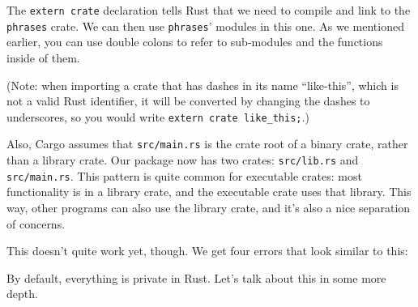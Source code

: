 \documentclass[a4paper,]{book}
\newenvironment{Shaded}{\begin{snugshade}}{\end{snugshade}}
\newcommand{\KeywordTok}[1]{\textcolor[rgb]{0.13,0.29,0.53}{\textbf{{#1}}}}
\newcommand{\StringTok}[1]{\textcolor[rgb]{0.31,0.60,0.02}{{#1}}}
\newcommand{\NormalTok}[1]{{#1}}
\begin{document}
The \texttt{extern\ crate} declaration tells Rust that we need to
compile and link to the \texttt{phrases} crate. We can then use
\texttt{phrases}' modules in this one. As we mentioned earlier, you can
use double colons to refer to sub-modules and the functions inside of
them.

(Note: when importing a crate that has dashes in its name ``like-this'',
which is not a valid Rust identifier, it will be converted by changing
the dashes to underscores, so you would write
\texttt{extern\ crate\ like\_this;}.)

Also, Cargo assumes that \texttt{src/main.rs} is the crate root of a
binary crate, rather than a library crate. Our package now has two
crates: \texttt{src/lib.rs} and \texttt{src/main.rs}. This pattern is
quite common for executable crates: most functionality is in a library
crate, and the executable crate uses that library. This way, other
programs can also use the library crate, and it's also a nice separation
of concerns.

This doesn't quite work yet, though. We get four errors that look
similar to this:

\begin{Shaded}
\end{Shaded}

By default, everything is private in Rust. Let's talk about this in some
more depth.
\end{document}
